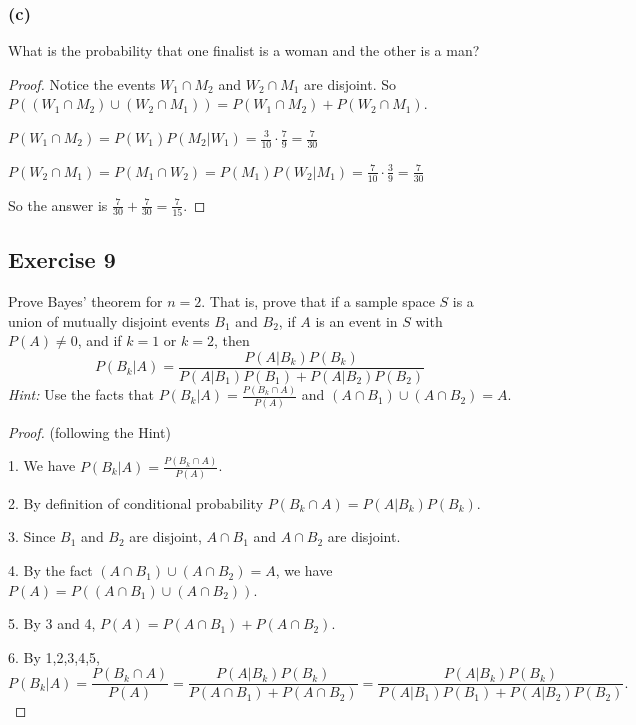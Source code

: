 \documentclass[14pt]{extarticle}
\begin{document}
\subsubsection{(c)}
What is the probability that one finalist is a woman and the other is a man?

\begin{proof}
     Notice the events \(W_1 \cap M_2\) and \(W_2 \cap M_1\) are disjoint. So \(P((W_1 \cap M_2) \cup (W_2 \cap M_1)) =
     P(W_1 \cap M_2) + P(W_2 \cap M_1)\).

     \(P(W_1 \cap M_2) = P(W_1)P(M_2 | W_1) = \frac{3}{10} \cdot \frac{7}{9} = \frac{7}{30}\)

     \(P(W_2 \cap M_1) = P(M_1 \cap W_2) = P(M_1)P(W_2 | M_1) = \frac{7}{10} \cdot \frac{3}{9} = \frac{7}{30}\)

     So the answer is \(\frac{7}{30} + \frac{7}{30} = \frac{7}{15}\).
\end{proof}

\subsection{Exercise 9}
Prove Bayes’ theorem for \(n = 2\). That is, prove that if a sample space \(S\) is a union of mutually disjoint events
\(B_1\) and \(B_2\), if \(A\) is an event in \(S\) with \(P(A) \neq 0\), and if \(k = 1\) or \(k = 2\), then
\[
     P(B_k | A) = \frac{P(A| B_k)P(B_k)}{P(A | B_1) P(B_1) + P(A | B_2) P(B_2)}
\]
{\it Hint:} Use the facts that \(P(B_k | A) = \frac{P(B_k \cap A)}{P(A)}\) and \((A \cap B_1) \cup (A \cap B_2) = A\).

\begin{proof}
     (following the Hint)

     1. We have \(P(B_k | A) = \frac{P(B_k \cap A)}{P(A)}\).

     2. By definition of conditional probability \(P(B_k \cap A) = P(A|B_k)P(B_k)\).

     3. Since \(B_1\) and \(B_2\) are disjoint, \(A \cap B_1\) and \(A \cap B_2\) are disjoint.

     4. By the fact \((A \cap B_1) \cup (A \cap B_2) = A\), we have \(P(A) = P((A \cap B_1) \cup (A \cap B_2))\).

     5. By 3 and 4, \(P(A) = P(A \cap B_1) + P(A \cap B_2)\).

     6. By 1,2,3,4,5,
     \[
          P(B_k | A) = \frac{P(B_k \cap A)}{P(A)} = \frac{P(A|B_k)P(B_k)}{P(A \cap B_1) + P(A \cap B_2)}
          = \frac{P(A|B_k)P(B_k)}{P(A|B_1)P(B_1) + P(A|B_2)P(B_2)}.
     \]
\end{proof}
\end{document}
